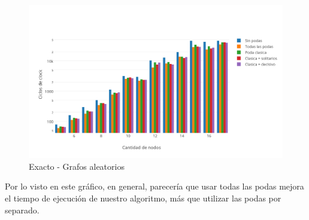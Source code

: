 \begin{figure}[htb]
	\begin{center}
    		\includegraphics[scale=0.8]{imagenes/exacto-aleatorios.png}
	\end{center}
	\caption{Exacto - Grafos aleatorios\label{fig:1F}}
\end{figure}

Por lo visto en este gráfico, en general, parecería que usar todas las podas mejora el tiempo de ejecución de nuestro algoritmo, más que utilizar las podas por separado.